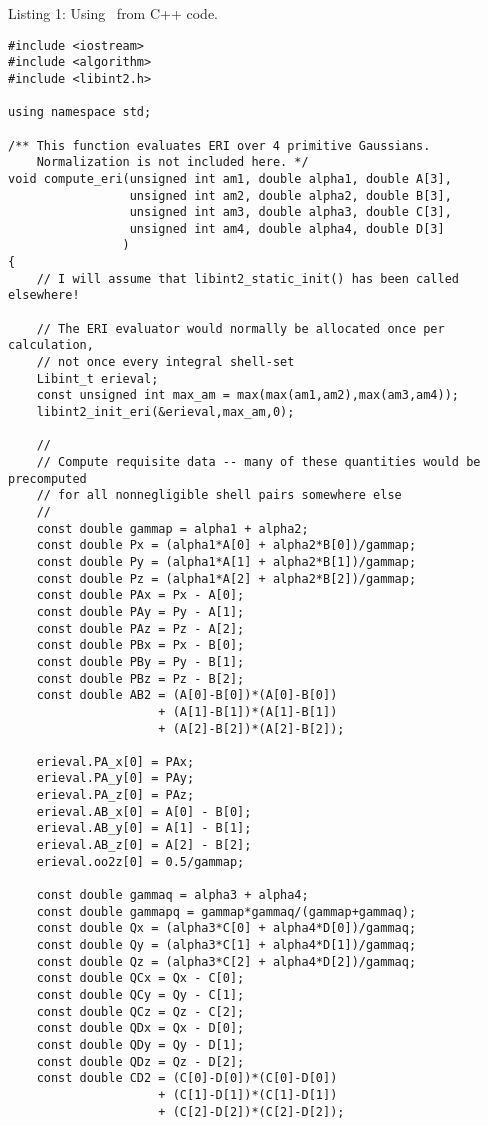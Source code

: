 \documentclass[12pt]{article}
\begin{document}
\begin{footnotesize}
Listing 1: Using \LIBINT\ from C++ code.
\begin{verbatim}
#include <iostream>
#include <algorithm>
#include <libint2.h>

using namespace std;

/** This function evaluates ERI over 4 primitive Gaussians.
    Normalization is not included here. */
void compute_eri(unsigned int am1, double alpha1, double A[3],
                 unsigned int am2, double alpha2, double B[3],
                 unsigned int am3, double alpha3, double C[3],
                 unsigned int am4, double alpha4, double D[3]
                )
{
    // I will assume that libint2_static_init() has been called elsewhere!

    // The ERI evaluator would normally be allocated once per calculation,
    // not once every integral shell-set
    Libint_t erieval;
    const unsigned int max_am = max(max(am1,am2),max(am3,am4));
    libint2_init_eri(&erieval,max_am,0);

    //
    // Compute requisite data -- many of these quantities would be precomputed
    // for all nonnegligible shell pairs somewhere else
    //
    const double gammap = alpha1 + alpha2;
    const double Px = (alpha1*A[0] + alpha2*B[0])/gammap;
    const double Py = (alpha1*A[1] + alpha2*B[1])/gammap;
    const double Pz = (alpha1*A[2] + alpha2*B[2])/gammap;
    const double PAx = Px - A[0];
    const double PAy = Py - A[1];
    const double PAz = Pz - A[2];
    const double PBx = Px - B[0];
    const double PBy = Py - B[1];
    const double PBz = Pz - B[2];
    const double AB2 = (A[0]-B[0])*(A[0]-B[0])
                     + (A[1]-B[1])*(A[1]-B[1])
                     + (A[2]-B[2])*(A[2]-B[2]);
    
    erieval.PA_x[0] = PAx;
    erieval.PA_y[0] = PAy;
    erieval.PA_z[0] = PAz;
    erieval.AB_x[0] = A[0] - B[0];
    erieval.AB_y[0] = A[1] - B[1];
    erieval.AB_z[0] = A[2] - B[2];
    erieval.oo2z[0] = 0.5/gammap;
    
    const double gammaq = alpha3 + alpha4;
    const double gammapq = gammap*gammaq/(gammap+gammaq);
    const double Qx = (alpha3*C[0] + alpha4*D[0])/gammaq;
    const double Qy = (alpha3*C[1] + alpha4*D[1])/gammaq;
    const double Qz = (alpha3*C[2] + alpha4*D[2])/gammaq;
    const double QCx = Qx - C[0];
    const double QCy = Qy - C[1];
    const double QCz = Qz - C[2];
    const double QDx = Qx - D[0];
    const double QDy = Qy - D[1];
    const double QDz = Qz - D[2];
    const double CD2 = (C[0]-D[0])*(C[0]-D[0])
                     + (C[1]-D[1])*(C[1]-D[1])
                     + (C[2]-D[2])*(C[2]-D[2]);
    

\end{verbatim}
\end{footnotesize}
\end{document}
